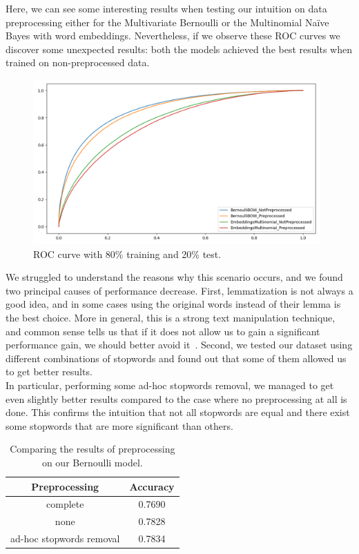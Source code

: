 Here, we can see some interesting results when testing our intuition on data preprocessing either for the Multivariate Bernoulli or the Multinomial Naïve Bayes with word embeddings. Nevertheless, if we observe these ROC curves we discover some unexpected results: both the models achieved the best results when trained on non-preprocessed data.
\clearpage


\begin{figure}[h!t]
    \centering
    \includegraphics[width=11cm]{../experiments/plots/preprocessing.png}
    \caption{ROC curve with 80\% training and 20\% test.}
    \label{fig:PREPROCESSING_ROC}
\end{figure}



We struggled to understand the reasons why this scenario occurs, and we found two principal causes of performance decrease. First, lemmatization is not always a good idea, and in some cases using the original words instead of their lemma is the best choice. More in general, this is a strong text manipulation technique, and common sense tells us that if it does not allow us to gain a significant performance gain, we should better avoid it~\cite{data:lemmatization_tips}. Second, we tested our dataset using different combinations of stopwords and found out that some of them allowed us to get better results.\\

In particular, performing some ad-hoc stopwords removal, we managed to get even slightly better results compared to the case where no preprocessing at all is done. This confirms the intuition that not all stopwords are equal and there exist some stopwords that are more significant than others.

\begin{table}[h!t]
    \centering
    \caption{Comparing the results of preprocessing on our Bernoulli model.}
    \label{tab:versus_metrics}
    \begin{tabular}{c|c}
        \hline
        Preprocessing & Accuracy \\
        \hline 
        complete & 0.7690 \\ 
        none & 0.7828 \\ 
        ad-hoc stopwords removal & 0.7834 \\ 
        \hline
    \end{tabular}
\end{table}
